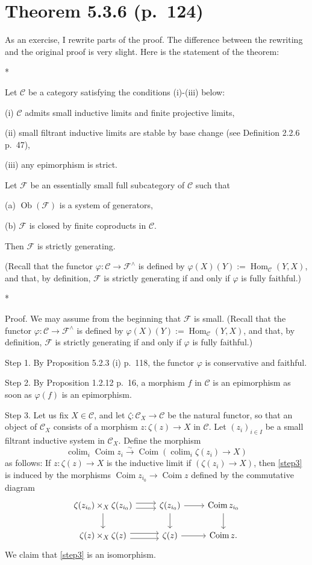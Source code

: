 \documentclass[12pt]{article}
\theoremstyle{remark}
\theoremstyle{definition}
\newcommand{\C}{\mathcal C}
\newcommand{\F}{\mathcal F}
\DeclareMathOperator*{\coli}{colim}
\DeclareMathOperator{\Coim}{Coim}
\DeclareMathOperator{\Hom}{Hom}%
\DeclareMathOperator{\Ob}{Ob}
\begin{document}
\section{Theorem 5.3.6 (p.~124)} %
%
As an exercise, I rewrite parts of the proof. The difference between the rewriting and the original proof is very slight. Here is the statement of the theorem:%
%
\begin{center}*\end{center}
%
Let $\C$ be a category satisfying the conditions (i)-(iii) below:

\noindent (i) $\C$ admits small inductive limits and finite projective limits, 

\noindent (ii) small filtrant inductive limits are stable by base change (see Definition 2.2.6 p.~47), 

\noindent (iii) any epimorphism is strict.

\noindent Let $\F$ be an essentially small full subcategory of $\C$ such that 

\noindent (a) $\Ob(\F)$ is a system of generators,

\noindent (b) $\F$ is closed by finite coproducts in $\C$. 

\noindent Then $\F$ is strictly generating.

(Recall that the functor $\varphi:\C\to\F^\wedge$ is defined by $\varphi(X)(Y):=\Hom_\C(Y,X)$, and that, by definition, $\F$ is strictly generating if and only if $\varphi$ is fully faithful.)
%
\begin{center}*\end{center}
%
Proof. We may assume from the beginning that $\F$ is small. (Recall that the functor $\varphi:\C\to\F^\wedge$ is defined by $\varphi(X)(Y):=\Hom_\C(Y,X)$, and that, by definition, $\F$ is strictly generating if and only if $\varphi$ is fully faithful.)

\noindent Step 1. By Proposition 5.2.3 (i) p.~118, the functor $\varphi$ is conservative and faithful.

\noindent Step 2. By Proposition 1.2.12 p.~16, a morphism $f$ in $\C$ is an epimorphism as soon as $\varphi(f)$ is an epimorphism.

\noindent Step 3. Let us fix $X\in\C$, and let $\zeta:\C_X\to\C$ be the natural functor, so that an object of $\C_X$ consists of a morphism $z:\zeta(z)\to X$ in $\C$. Let $(z_i)_{i\in I}$ be a small filtrant inductive system in $\C_X$. Define the morphism 
\begin{equation}\label{step3}
\coli_i\Coim z_i\xrightarrow{\sim}\Coim\left(\coli_i\zeta(z_i)\to X\right)
\end{equation}
as follows: If $z:\zeta(z)\to X$ is the inductive limit if $(\zeta(z_i)\to X)$, then \eqref{step3} is induced by the morphisms $\Coim z_{i_0}\to\Coim z$ defined by the commutative diagram 
$$
\begin{tikzcd}
\zeta(z_{i_0})\times_X\zeta(z_{i_0})\ar{d}\ar[yshift=0.7ex]{r}\ar[yshift=-0.7ex]{r}&\zeta(z_{i_0})\ar{d}\ar{r}&\Coim z_{i_0}\ar{d}\\ 
\zeta(z)\times_X\zeta(z)\ar[yshift=0.7ex]{r}\ar[yshift=-0.7ex]{r}&\zeta(z)\ar{r}&\Coim z.
\end{tikzcd}
$$ 
We claim that \eqref{step3} is an isomorphism.
\end{document}
